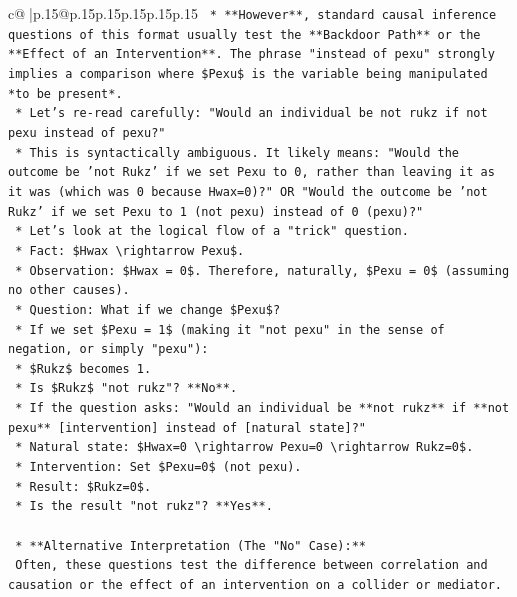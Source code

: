 \documentclass{article}
\begin{document}
{\begin{supertabular}{c@{$\;$}|p{.15\linewidth}@{}p{.15\linewidth}p{.15\linewidth}p{.15\linewidth}p{.15\linewidth}p{.15\linewidth}}
{{{\texttt{    *   **However**, standard causal inference questions of this format usually test the **Backdoor Path** or the **Effect of an Intervention**. The phrase "instead of pexu" strongly implies a comparison where \$Pexu\$ is the variable being manipulated *to be present*.} \\
\texttt{    *   Let's re{-}read carefully: "Would an individual be not rukz if not pexu instead of pexu?"} \\
\texttt{    *   This is syntactically ambiguous. It likely means: "Would the outcome be 'not Rukz' if we set Pexu to 0, rather than leaving it as it was (which was 0 because Hwax=0)?" OR "Would the outcome be 'not Rukz' if we set Pexu to 1 (not pexu) instead of 0 (pexu)?"} \\
\texttt{    *   Let's look at the logical flow of a "trick" question.} \\
\texttt{        *   Fact: \$Hwax \textbackslash{}rightarrow Pexu\$.} \\
\texttt{        *   Observation: \$Hwax = 0\$. Therefore, naturally, \$Pexu = 0\$ (assuming no other causes).} \\
\texttt{        *   Question: What if we change \$Pexu\$?} \\
\texttt{        *   If we set \$Pexu = 1\$ (making it "not pexu" in the sense of negation, or simply "pexu"):} \\
\texttt{            *   \$Rukz\$ becomes 1.} \\
\texttt{            *   Is \$Rukz\$ "not rukz"? **No**.} \\
\texttt{        *   If the question asks: "Would an individual be **not rukz** if **not pexu** {[}intervention{]} instead of {[}natural state{]}?"} \\
\texttt{            *   Natural state: \$Hwax=0 \textbackslash{}rightarrow Pexu=0 \textbackslash{}rightarrow Rukz=0\$.} \\
\texttt{            *   Intervention: Set \$Pexu=0\$ (not pexu).} \\
\texttt{            *   Result: \$Rukz=0\$.} \\
\texttt{            *   Is the result "not rukz"? **Yes**.} \\
\\ 
\texttt{    *   **Alternative Interpretation (The "No" Case):**} \\
\texttt{        Often, these questions test the difference between correlation and causation or the effect of an intervention on a collider or mediator.} \\
}}}
\end{supertabular}}
\end{document}
